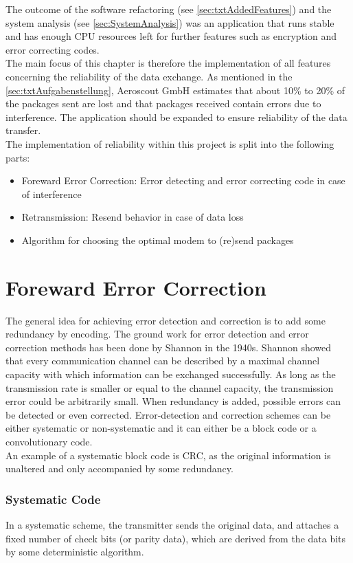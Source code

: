 %
The outcome of the software refactoring (see \autoref{sec:txtAddedFeatures}) and the system analysis (see \autoref{sec:SystemAnalysis}) was an application that runs stable and has enough CPU resources left for further features such as encryption and error correcting codes.\\
The main focus of this chapter is therefore the implementation of all features concerning the reliability of the data exchange. As mentioned in the \autoref{sec:txtAufgabenstellung}, Aeroscout GmbH estimates that about 10\% to 20\% of the packages sent are lost and that packages received contain errors due to interference. The application should be expanded to ensure reliability of the data transfer.\\
The implementation of reliability within this project is split into the following parts:
\begin{itemize}
    \item Foreward Error Correction: Error detecting and error correcting code in case of interference
    \item Retransmission: Resend behavior in case of data loss
    \item Algorithm for choosing the optimal modem to (re)send packages
\end{itemize}
%
%
%
%
%
\section{Foreward Error Correction}
The general idea for achieving error detection and correction is to add some redundancy by encoding. The ground work for error detection and error correction methods has been done by Shannon in the 1940s. Shannon showed that every communication channel can be described by a maximal channel capacity with which information can be exchanged successfully. As long as the transmission rate is smaller or equal to the channel capacity, the transmission error could be arbitrarily small. When redundancy is added, possible errors can be detected or even corrected. Error-detection and correction schemes can be either systematic or non-systematic and it can either be a block code or a convolutionary code.\\
An example of a systematic block code is CRC, as the original information is unaltered and only accompanied by some redundancy.
%
\subsubsection{Systematic Code}
In a systematic scheme, the transmitter sends the original data, and attaches a fixed number of check bits (or parity data), which are derived from the data bits by some deterministic algorithm.
